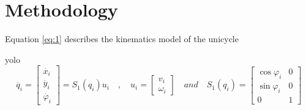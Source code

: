 \chapter{Methodology}\label{chap:Methodology}

Equation \eqref{eq:1} describes the kinematics model of the unicycle

\ac{yolo}
\begin{equation} \label{eq:1}
\dot{q_i} = 
\begin{bmatrix}
	\dot{x_i}\\
	\dot{y_i}\\
	\dot{\varphi_i}
\end{bmatrix}
=
S_{1}(q_i)u_i
 \quad , \quad
  u_i = 
\begin{bmatrix}
	v_i\\
	\omega_i
\end{bmatrix}
 \quad and \quad
S_{1}(q_i) = 
\begin{bmatrix}
	\cos\varphi_i & 0\\
	\sin\varphi_i & 0\\
	0 & 1
\end{bmatrix}
\end{equation}

